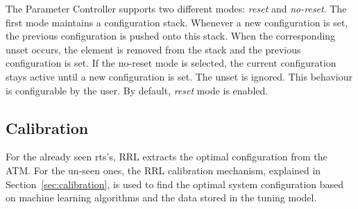 The Parameter Controller supports two different modes: \textit{reset} and \textit{no-reset}. The first mode maintains a configuration stack. Whenever a new configuration is set, the previous configuration is pushed onto this stack. When the corresponding unset occurs, the element is removed from the stack and the previous configuration is set. If the no-reset mode is selected, the current configuration stays active until a new configuration is set. The unset is ignored. This behaviour is configurable by the user. By default, \textit{reset} mode is enabled.

\subsection{Calibration}\label{calibr}
 For the already seen rts's, RRL extracts the optimal configuration from the ATM. For the un-seen ones, the RRL calibration mechanism, explained in Section~\ref{sec:calibration}, is used to find the optimal system configuration based on machine learning algorithms and the data stored in the tuning model. 

 
